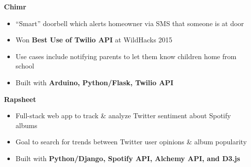 \documentclass[10pt,a4paper,sans]{moderncv}        %
\begin{document}
\vspace{3pt}
\textbf{Chimr}
\begin{itemize}
  \item ``Smart'' doorbell which alerts homeowner via SMS that someone is at door
  \item Won \textbf{Best Use of Twilio API} at WildHacks 2015
  \item Use cases include notifying parents to let them know children home from school
  \item Built with \textbf{Arduino, Python/Flask, Twilio API}
\end{itemize}

\vspace{3pt}
\textbf{Rapsheet}
\begin{itemize}
  \item Full-stack web app to track \& analyze Twitter sentiment about Spotify albums
  \item Goal to search for trends between Twitter user opinions \& album popularity
  \item Built with \textbf{Python/Django, Spotify API, Alchemy API, and D3.js}
\end{itemize}


%
%
%
%
%
%
%
%
\end{document}
